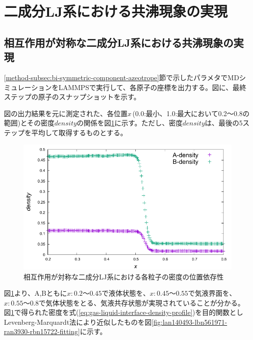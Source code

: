 \documentclass[titlepage]{jsreport}
\begin{document}
\section{二成分LJ系における共沸現象の実現} \label{results-sec:bi-component-azeotrope}
\subsection{相互作用が対称な二成分LJ系における共沸現象の実現} \label{results-subsec:bi-symmetric-component-azeotrope}
\ref{method-subsec:bi-symmetric-component-azeotrope}節で示したパラメタでMDシミュレーションをLAMMPSで実行して、各原子の座標を出力する。図に、最終ステップの原子のスナップショットを示す。

図の出力結果を元に測定された、各位置$x$\,(0.0:最小、1.0:最大において0.2〜0.8の範囲)とその密度$density$の関係を図\ref{fig:lan140493-lbn561971-ran3930-rbn15722}に示す。ただし、密度$density$は、最後の5ステップを平均して取得するものとする。

\begin{figure}[htbp]
    \begin{center}
        \includegraphics[width=14cm]{fig/lan140493-lbn561971-ran3930-rbn15722/lan140493-lbn561971-ran3930-rbn15722.pdf}
    \end{center}
    \caption{相互作用が対称な二成分LJ系における各粒子の密度の位置依存性}
    \label{fig:lan140493-lbn561971-ran3930-rbn15722}
\end{figure}

図\ref{fig:lan140493-lbn561971-ran3930-rbn15722}より、A,Bともに$x:0.2〜0.45$で液体状態を、$x:0.45〜0.55$で気液界面を、$x:0.55〜0.8$で気体状態をとる、気液共存状態が実現されていることが分かる。図\ref{fig:lan140493-lbn561971-ran3930-rbn15722}で得られた密度を式(\ref{eq:gas-liquid-interface-density-profile})を目的関数としLevenberg-Marquardt法により近似したものを図\ref{fig:lan140493-lbn561971-ran3930-rbn15722-fitting}に示す。
\end{document}
